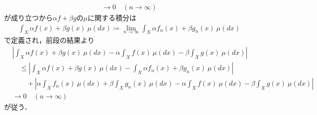 \begin{prf}
\begin{description}
\begin{align}
					\longrightarrow 0 \quad (n \longrightarrow \infty)
				\end{align}
				が成り立つから$\alpha f + \beta g$の$\mu$に関する積分は
				\begin{align}
					\int_X \alpha f(x) + \beta g(x)\ \mu(dx) \coloneqq \lim_{n \to \infty} \int_X \alpha f_n(x) + \beta g_n(x)\ \mu(dx)
				\end{align}
				で定義され，前段の結果より
				\begin{align}
					&\left| \int_X \alpha f(x) + \beta g(x)\ \mu(dx) - \alpha \int_X f(x)\ \mu(dx) - \beta \int_X g(x)\ \mu(dx) \right| \\
					&\quad\leq \left| \int_X \alpha f(x) + \beta g(x)\ \mu(dx) - \int_X \alpha f_n(x) + \beta g_n(x)\ \mu(dx) \right| \\
						&\qquad+ \left| \alpha \int_X f_n(x)\ \mu(dx) + \beta \int_X g_n(x)\ \mu(dx) - \alpha \int_X f(x)\ \mu(dx) - \beta \int_X g(x)\ \mu(dx) \right| \\
					&\longrightarrow 0 \quad (n \longrightarrow \infty)
				\end{align}
				が従う．
				\QED
		\end{description}
	\end{prf}